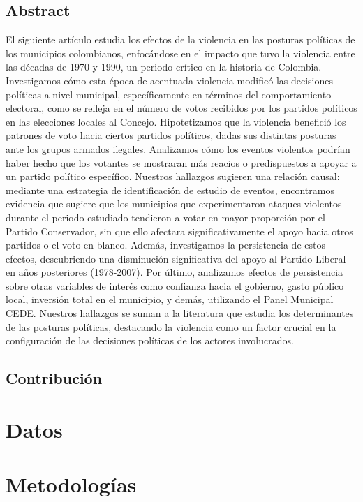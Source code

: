 \documentclass[a4paper]{article}
\begin{document}
\subsection{Abstract}
El siguiente artículo estudia los efectos de la violencia en las posturas políticas de los municipios colombianos, enfocándose en el impacto que tuvo la violencia entre las décadas de 1970 y 1990, un periodo crítico en la historia de Colombia. Investigamos cómo esta época de acentuada violencia modificó las decisiones políticas a nivel municipal, específicamente en términos del comportamiento electoral, como se refleja en el número de votos recibidos por los partidos políticos en las elecciones locales al Concejo. Hipotetizamos que la violencia benefició los patrones de voto hacia ciertos partidos políticos, dadas sus distintas posturas ante los grupos armados ilegales. Analizamos cómo los eventos violentos podrían haber hecho que los votantes se mostraran más reacios o predispuestos a apoyar a un partido político específico. Nuestros hallazgos sugieren una relación causal: mediante una estrategia de identificación de estudio de eventos, encontramos evidencia que sugiere que los municipios que experimentaron ataques violentos durante el periodo estudiado tendieron a votar en mayor proporción por el Partido Conservador, sin que ello afectara significativamente el apoyo hacia otros partidos o el voto en blanco. Además, investigamos la persistencia de estos efectos, descubriendo una disminución significativa del apoyo al Partido Liberal en años posteriores (1978-2007). Por último, analizamos efectos de persistencia sobre otras variables de interés como confianza hacia el gobierno, gasto público local, inversión total en el municipio, y demás, utilizando el Panel Municipal CEDE. Nuestros hallazgos se suman a la literatura que estudia los determinantes de las posturas políticas, destacando la violencia como un factor crucial en la configuración de las decisiones políticas de los actores involucrados.

\subsection{Contribución}

\section{Datos}

\section{Metodologías}
\end{document}
